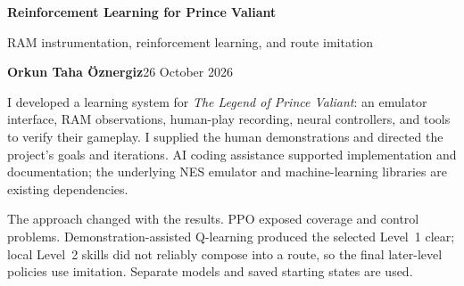 \documentclass[11pt,a4paper]{article}
\newcommand{\topic}[2]{\vspace*{-4mm}{\small\color{teal}\textbf{#1}}\par{\LARGE\bfseries #2}\par\vspace{3mm}}
\begin{document}
\topic{01 / PROJECT OVERVIEW}{Reinforcement Learning for Prince Valiant}
{\large RAM instrumentation, reinforcement learning, and route imitation}\par
\textbf{Orkun Taha Öznergiz}\hfill 26 October 2026

I developed a learning system for \emph{The Legend of Prince Valiant}: an emulator interface, RAM observations, human-play recording, neural controllers, and tools to verify their gameplay. I supplied the human demonstrations and directed the project's goals and iterations. AI coding assistance supported implementation and documentation; the underlying NES emulator and machine-learning libraries are existing dependencies.

The approach changed with the results. PPO exposed coverage and control problems. Demonstration-assisted Q-learning produced the selected Level~1 clear; local Level~2 skills did not reliably compose into a route, so the final later-level policies use imitation. Separate models and saved starting states are used.
\end{document}
